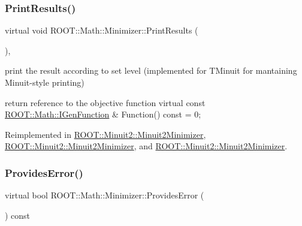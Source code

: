 \subsubsection{\texorpdfstring{PrintResults()}{PrintResults()}\hspace{0.1cm}{\footnotesize\ttfamily [3/3]}}
{\footnotesize\ttfamily virtual void R\+O\+O\+T\+::\+Math\+::\+Minimizer\+::\+Print\+Results (\begin{DoxyParamCaption}{ }\end{DoxyParamCaption})\hspace{0.3cm}{\ttfamily [inline]}, {\ttfamily [virtual]}}



print the result according to set level (implemented for T\+Minuit for mantaining Minuit-\/style printing) 

return reference to the objective function virtual const \mbox{\hyperlink{namespaceROOT_1_1Math_afe6400b4439b79d54c41fb9f5c5af171}{R\+O\+O\+T\+::\+Math\+::\+I\+Gen\+Function}} \& Function() const = 0; 

Reimplemented in \mbox{\hyperlink{classROOT_1_1Minuit2_1_1Minuit2Minimizer_a0caadc2005eac5d87fc7345bd54decf0}{R\+O\+O\+T\+::\+Minuit2\+::\+Minuit2\+Minimizer}}, \mbox{\hyperlink{classROOT_1_1Minuit2_1_1Minuit2Minimizer_a0caadc2005eac5d87fc7345bd54decf0}{R\+O\+O\+T\+::\+Minuit2\+::\+Minuit2\+Minimizer}}, and \mbox{\hyperlink{classROOT_1_1Minuit2_1_1Minuit2Minimizer_a0caadc2005eac5d87fc7345bd54decf0}{R\+O\+O\+T\+::\+Minuit2\+::\+Minuit2\+Minimizer}}.

\mbox{\label{classROOT_1_1Math_1_1Minimizer_a71837caa295c76303c1a14679be1898d}} 
\subsubsection{\texorpdfstring{ProvidesError()}{ProvidesError()}\hspace{0.1cm}{\footnotesize\ttfamily [1/3]}}
{\footnotesize\ttfamily virtual bool R\+O\+O\+T\+::\+Math\+::\+Minimizer\+::\+Provides\+Error (\begin{DoxyParamCaption}{ }\end{DoxyParamCaption}) const\hspace{0.3cm}{\ttfamily [pure virtual]}}



